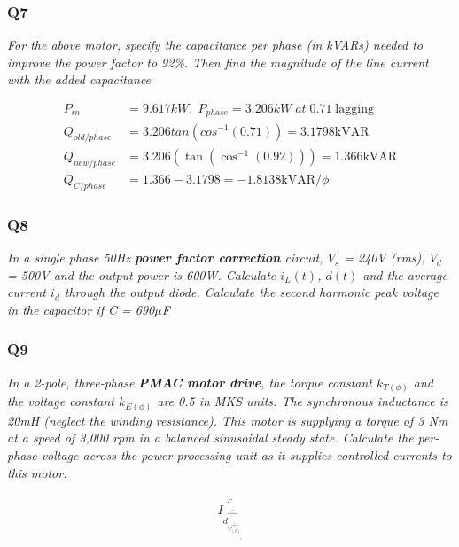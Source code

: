 \documentclass[a4paper,11pt]{article}
\begin{document}
\subsubsection*{Q7}
\textit{For the above motor, specify the capacitance per phase (in kVARs) needed to improve the power factor to 92\%. Then find the magnitude of the line current with the added capacitance}

\begin{align*}
    P_{in} &= 9.617kW,\; P_{phase}=3.206kW\;at\;0.71\;\mathrm{lagging}\\
    Q_{old/phase} &= 3.206tan(cos^{-1}(0.71)) = 3.1798 \mathrm{kVAR} \\
    Q_{new/phase} &= 3.206\left(\tan\left(\cos^{-1}\left(0.92\right)\right)\right) = 1.366 \mathrm{kVAR} \\
    Q_{C/phase} &= 1.366 - 3.1798=-1.8138 \mathrm{kVAR}/\phi
\end{align*}


\subsubsection*{Q8}
\textit{In a single phase 50Hz \textbf{power factor correction} circuit, $V_s$ = 240V (rms), $V_d$ = 500V and the output power is 600W. Calculate $i_L(t)$, $d(t)$ and the average current $i_d$ through the output diode. Calculate the second harmonic peak voltage in the capacitor if C = 690$\mu$F}



\subsubsection*{Q9}
\textit{In a 2-pole, three-phase \textbf{PMAC motor drive}, the torque constant $k_{T(\phi)}$ and the voltage constant $k_{E(\phi)}$ are 0.5 in MKS units. The synchronous inductance is 20mH (neglect the winding resistance). This motor is supplying a torque of 3 Nm at a speed of 3,000 rpm in a balanced sinusoidal steady state. Calculate the per-phase voltage across the power-processing unit as it supplies controlled currents to this motor.}



$$  \hat{\bar{\dot{I_{\bar{\hat{\dot{d_{\dot{\bar{\hat{V_{(t)_{\bar{\hat{\hat{\bar{i}}}}}}}}}}}}}}}}} $$
\end{document}
